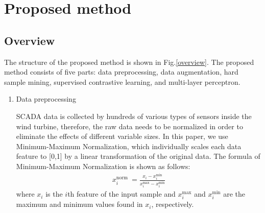 \documentclass[lettersize,journal]{IEEEtran}
\begin{document}
\section{Proposed method}
\label{proposedmethod}
\subsection{Overview}%

The structure of the proposed method is shown in Fig.\ref{overview}. The proposed method consists of five parts: data preprocessing, data augmentation, hard sample mining, supervised contrastive learning, and multi-layer perceptron.

\begin{enumerate}%
\item Data preprocessing

SCADA data is collected by hundreds of various types of sensors inside the wind turbine, therefore, the raw data needs to be normalized in order to eliminate the effects of different variable sizes. In this paper, we use Minimum-Maximum Normalization, which individually scales each data feature to [0,1] by a linear transformation of the original data. 
The formula of Minimum-Maximum Normalization is shown as follows:
\begin{equation}
\begin{aligned}
    x_i^{\text {norm }}=\frac{x_i-x_i^{\min }}{x_i^{\max }-x_i^{\min }}
\end{aligned}
\label{normalization}
\end{equation}
where $x_i$ is the $i$th feature of the input sample and $x_i^{\max}$ and $x_i^{\min}$ are the maximum and minimum values found in $x_i$, respectively.




\end{enumerate}
\end{document}
